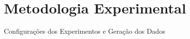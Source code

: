 \section{Metodologia Experimental}

\begin{frame}{Configurações dos Experimentos e Geração dos Dados}

\end{frame}